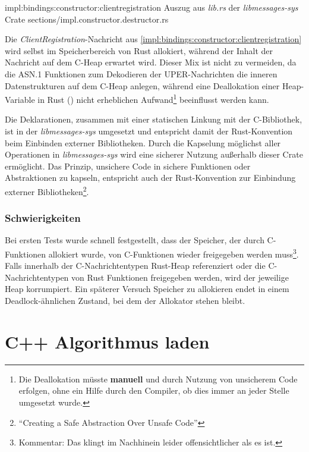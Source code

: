 \rustcinclude
	{impl:bindings:constructor:clientregistration}
	{Auszug aus \textit{lib.rs} der \textit{libmessages-sys} Crate}
	{sections/impl.constructor.destructor.rs}
	
Die \textit{ClientRegistration}-Nachricht aus \autoref{impl:bindings:constructor:clientregistration} wird selbst im Speicherbereich von Rust allokiert, während der Inhalt der Nachricht auf dem C-Heap erwartet wird.
 Dieser Mix ist nicht zu vermeiden, da die ASN.1 Funktionen zum Dekodieren der UPER-Nachrichten die inneren Datenstrukturen auf dem C-Heap anlegen, während eine Deallokation einer Heap-Variable in Rust () nicht erheblichen Aufwand\footnote{Die Deallokation müsste \textbf{manuell} und durch Nutzung von unsicherem Code erfolgen, ohne ein Hilfe durch den Compiler, ob dies immer an jeder Stelle umgesetzt wurde.} beeinflusst werden kann.

Die Deklarationen, zusammen mit einer statischen Linkung mit der C-Bibliothek, ist in der \textit{libmessages-sys} umgesetzt und entspricht damit der Rust-Konvention beim Einbinden externer Bibliotheken\cite{rust:cargo:build_scripts}.
Durch die Kapselung möglichst aller  Operationen in \textit{libmessages-sys} wird eine sicherer Nutzung außerhalb dieser Crate ermöglicht.
Das Prinzip, unsichere Code in sichere Funktionen oder Abstraktionen zu kapseln, entspricht auch der Rust-Konvention zur Einbindung externer Bibliotheken\footnote{\enquote{Creating a Safe Abstraction Over Unsafe Code}}\cite{rust:book:unsafe}.



\subsubsection{Schwierigkeiten}

Bei ersten Tests wurde schnell festgestellt, dass der Speicher, der durch C-Funktionen allokiert wurde, von C-Funktionen wieder freigegeben werden muss\footnote{Kommentar: Das klingt im Nachhinein leider offensichtlicher als es ist.}.
Falls innerhalb der C-Nachrichtentypen Rust-Heap referenziert oder die C-Nachrichtentypen von Rust Funktionen freigegeben werden, wird der jeweilige Heap korrumpiert.
Ein späterer Versuch Speicher zu allokieren endet in einem Deadlock-ähnlichen Zustand, bei dem der Allokator stehen bleibt.



\clearpage
\section{C++ Algorithmus laden}


